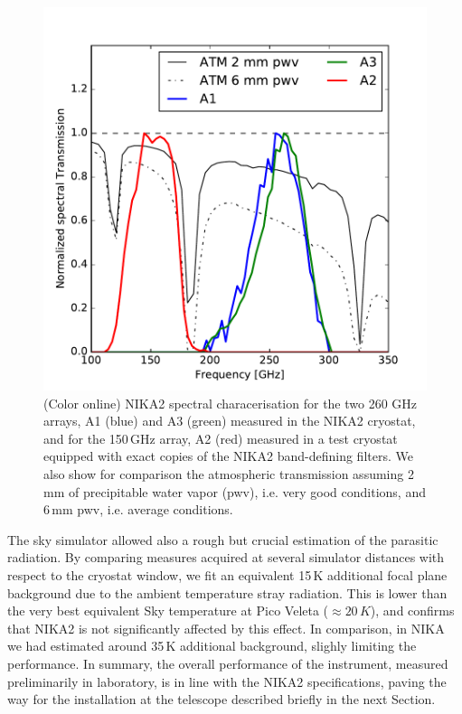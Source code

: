 \documentclass[]{aa} %
\begin{document}
\begin{figure}[h]
   \centering
    \includegraphics[width=1.0\linewidth]{atm_transmission.pdf}
      \caption{(Color online) NIKA2 spectral characerisation for the two 260 GHz arrays, A1 (blue) and A3 (green) measured in the NIKA2 cryostat, and for the 150\,GHz array, A2 (red) measured in a test cryostat equipped with exact copies of the NIKA2 band-defining filters. We also show for comparison the atmospheric transmission assuming 2\,mm of precipitable water vapor (pwv), i.e. very good conditions, and 6\,mm pwv, i.e. average conditions.
         \label{Fig4}}
\end{figure}

The sky simulator allowed also a rough but crucial estimation of the parasitic radiation. By comparing measures acquired at several simulator distances with respect to the cryostat window, we fit an equivalent 15\,K additional focal plane background due to the ambient temperature stray radiation. This is lower than the very best equivalent Sky temperature at Pico Veleta ($\approx 20\,K$), and confirms that NIKA2 is not significantly affected by this effect. In comparison, in NIKA we had estimated around 35\,K additional background, slighly limiting the performance. 
In summary, the overall performance of the instrument, measured preliminarily in laboratory, is in line with the NIKA2 specifications, paving the way for the installation at the telescope described briefly in the next Section. 
\end{document}
